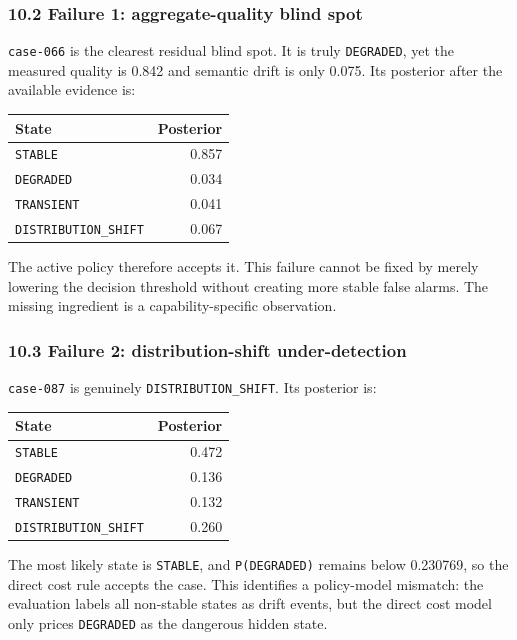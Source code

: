 \documentclass[
]{article}
\begin{document}
\subsubsection{10.2 Failure 1: aggregate-quality blind
spot}\label{failure-1-aggregate-quality-blind-spot}

\texttt{case-066} is the clearest residual blind spot. It is truly
\texttt{DEGRADED}, yet the measured quality is 0.842 and semantic drift
is only 0.075. Its posterior after the available evidence is:

\begin{longtable}[]{@{}lr@{}}
\toprule\noalign{}
State & Posterior \\
\midrule\noalign{}
\endhead
\bottomrule\noalign{}
\endlastfoot
\texttt{STABLE} & 0.857 \\
\texttt{DEGRADED} & 0.034 \\
\texttt{TRANSIENT} & 0.041 \\
\texttt{DISTRIBUTION\_SHIFT} & 0.067 \\
\end{longtable}

The active policy therefore accepts it. This failure cannot be fixed by
merely lowering the decision threshold without creating more stable
false alarms. The missing ingredient is a capability-specific
observation.

\subsubsection{10.3 Failure 2: distribution-shift
under-detection}\label{failure-2-distribution-shift-under-detection}

\texttt{case-087} is genuinely \texttt{DISTRIBUTION\_SHIFT}. Its
posterior is:

\begin{longtable}[]{@{}lr@{}}
\toprule\noalign{}
State & Posterior \\
\midrule\noalign{}
\endhead
\bottomrule\noalign{}
\endlastfoot
\texttt{STABLE} & 0.472 \\
\texttt{DEGRADED} & 0.136 \\
\texttt{TRANSIENT} & 0.132 \\
\texttt{DISTRIBUTION\_SHIFT} & 0.260 \\
\end{longtable}

The most likely state is \texttt{STABLE}, and \texttt{P(DEGRADED)}
remains below 0.230769, so the direct cost rule accepts the case. This
identifies a policy-model mismatch: the evaluation labels all non-stable
states as drift events, but the direct cost model only prices
\texttt{DEGRADED} as the dangerous hidden state.
\end{document}
